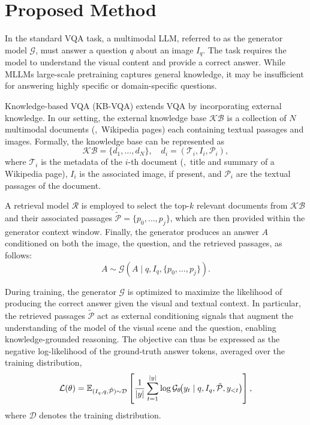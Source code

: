 \section{Proposed Method}
\label{sec:method}

In the standard VQA task, a multimodal LLM, referred to as the generator model $\mathcal{G}$, must answer a question $q$ about an image $\mathit{I_q}$. The task requires the model to understand the visual content and provide a correct answer. 
While MLLMs large-scale pretraining captures general knowledge, it may be insufficient for answering highly specific or domain-specific questions.

Knowledge-based VQA (KB-VQA) extends VQA by incorporating external knowledge. 
In our setting, the external knowledge base $\mathcal{KB}$ is a collection of $N$ multimodal documents (\eg,~Wikipedia pages) each containing textual passages and images. Formally, the knowledge base can be represented as
\begin{equation}
    \mathcal{KB} = \{d_1, \dots , d_N\}, \quad  d_i = (\mathcal{T}_i, I_i, \mathcal{P}_i),
\end{equation} 
where $\mathcal{T}_i$ is the metadata of the $i$-th document (\eg,~title and summary of a Wikipedia page), $I_i$ is the associated image, if present, and $\mathcal{P}_i$ are the textual passages of the document.

A retrieval model $\mathcal{R}$ is employed to select the top-$k$ relevant documents from $\mathcal{KB}$ and their associated passages $\mathcal{\tilde{P}} = \{ p_0, \dots, p_j \}$, which are then provided within the generator context window. 
Finally, the generator produces an answer $A$ conditioned on both the image, the question, and the retrieved passages, as follows:
\begin{equation}
\label{eq:answer}
A \sim \mathcal{G}(A \mid q, I_q,\{ p_0, \dots, p_j \}).
\end{equation}

During training, the generator $\mathcal{G}$ is optimized to maximize the likelihood of producing the correct answer given the visual and textual context. In particular, the retrieved passages $\tilde{\mathcal{P}}$ act as external conditioning signals that augment the understanding of the model of the visual scene and the question, enabling knowledge-grounded reasoning. The objective can thus be expressed as the negative log-likelihood of the ground-truth answer tokens, averaged over the training distribution, \ie
\begin{equation}
\small
\label{eq:gen loss}
\mathcal{L}(\theta)
= \mathbb{E}_{(I_q, q, \tilde{\mathcal{P}}) \sim \mathcal{D}}\left[
\frac{1}{|y|}\sum_{t=1}^{|y|} \log \mathcal{G}_\theta\!\big(y_t \mid q, I_q, \tilde{\mathcal{P}}, y_{<t}\big)
\right],
\end{equation} where $\mathcal{D}$ denotes the training distribution.


